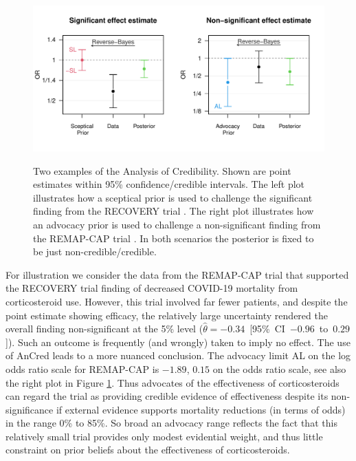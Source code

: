 \begin{figure}[!htb]
\begin{knitrout}
\color{fgcolor}
{\centering \includegraphics[width=\maxwidth]{images/paper4/AnCred-examples-plot-1}
}
\end{knitrout}
\caption{Two examples of the Analysis of Credibility. Shown are point estimates
  within 95\% confidence/credible intervals. The left plot illustrates how a
  sceptical prior is used to challenge the significant finding from the RECOVERY
  trial \citep{RECOVERY2020}. The right plot illustrates how an advocacy prior
  is used to challenge a non-significant finding from the \mbox{REMAP-CAP} trial
  \citep{REMAPCAP2020}. In both scenarios the posterior is fixed to be just
  non-credible/credible.}
\label{fig4:anCredEx}
\end{figure}

For illustration we consider the data from the REMAP-CAP trial that supported
the RECOVERY trial finding of decreased COVID-19 mortality from corticosteroid
use. However, this trial involved far fewer patients, and despite the point
estimate showing efficacy, the relatively large uncertainty rendered the overall
finding non-significant at the 5\% level (\mbox{$\hat{\theta} = -0.34$ [95\% CI
  $-0.96$ to $0.29$]}). Such an outcome is frequently (and wrongly) taken to
imply no effect. The use of AnCred leads to a more nuanced conclusion. The
advocacy limit AL on the log odds ratio scale for REMAP-CAP is $-1.89$, \ie{}
$0.15$ on the odds ratio scale, see also the right plot in Figure
\ref{fig4:anCredEx}. Thus advocates of the effectiveness of corticosteroids can
regard the trial as providing credible evidence of effectiveness despite its
non-significance if external evidence supports mortality reductions (in terms of
odds) in the range 0\% to 85\%. So broad an advocacy range reflects the fact
that this relatively small trial provides only modest evidential weight, and
thus little constraint on prior beliefs about the effectiveness of
corticosteroids.

